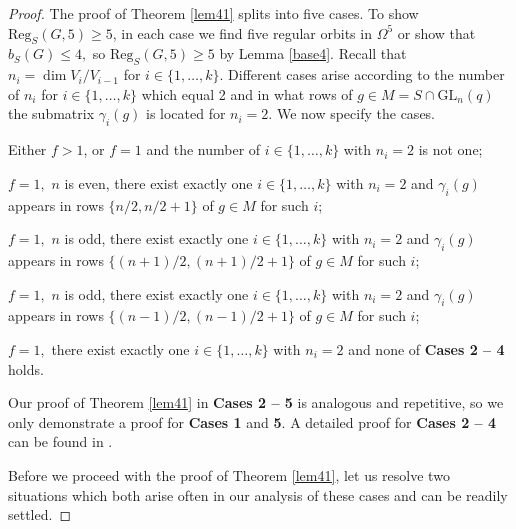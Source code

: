 \documentclass[a4paper,reqno,11pt]{amsart}
\theoremstyle{definition}
\theoremstyle{remark}
\numberwithin{equation}{section}
\newcommand{\Reg}{\mathrm{Reg}}
\newcommand{\GL}{{\mathrm{GL}}}
\begin{document}
\begin{proof}
The proof of Theorem \ref{lem41} splits into five cases. To show $\Reg_S(G,5) \ge 5$, in each case we find five regular orbits in $\Omega^5$ or show that $b_S(G)\le 4,$ so $\Reg_S(G,5) \ge 5$ by Lemma \ref{base4}. Recall that $n_i = \dim V_i/V_{i-1}$ for $i \in \{1, \ldots, k\}.$  Different cases arise according to the number of $n_i$ for $i \in \{1, \ldots, k\}$ which equal 2  and in what rows of  $g \in M=S\cap \GL_n(q)$ the submatrix $\gamma_i(g)$ is located for $n_i=2.$ We now specify the cases.
\begin{description}[before={\renewcommand\makelabel[1]{\bfseries ##1}}]
\item[{\bf Case 1.}] Either $f>1$, or $f=1$ and the number of $i \in \{1, \ldots, k\}$ with $n_i=2$ is not one;
\item[{\bf Case 2.}] $f=1, $ $n$ is even, there exist exactly one $i \in \{1, \ldots, k\}$ with $n_i=2$ and $\gamma_i(g)$ appears in rows  $\{n/2,n/2+1\}$ of $g \in M$ for such $i$;
\item[{\bf Case 3.}] $f=1, $ $n$ is odd, there exist exactly one $i \in \{1, \ldots, k\}$ with $n_i=2$ and $\gamma_i(g)$ appears in rows  $\{(n+1)/2,(n+1)/2+1\}$ of $g \in M$ for such $i$;
\item[{\bf Case 4.}] $f=1, $ $n$ is odd, there exist exactly one $i \in \{1, \ldots, k\}$ with $n_i=2$ and $\gamma_i(g)$ appears in rows  $\{(n-1)/2,(n-1)/2+1\}$ of $g \in M$ for such $i$;
\item[{\bf Case 5.}] $f=1,$ there exist exactly one $i \in \{1, \ldots, k\}$ with $n_i=2$ and none of {\bf Cases 2 -- 4} holds. 
\end{description}


Our proof of Theorem \ref{lem41} in {\bf Cases 2 -- 5} is analogous and repetitive, so we only demonstrate a proof for {\bf Cases 1} and {\bf 5}. A detailed proof for {\bf Cases 2 -- 4} can be found in \cite{thesis}.

\medskip

Before we proceed with the proof of Theorem \ref{lem41}, let us resolve two situations which both arise often in our analysis of these cases and can be readily settled.


\end{proof}
\end{document}
